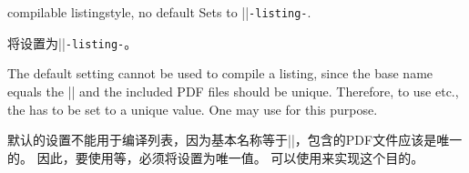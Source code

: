 \begin{docTcbKey}[][doc new and updated={2014-11-14}{2016-05-27}]{compilable listing}{}{style, no default}
Sets  to |\jobname|\texttt{-listing-}.

将设置为|\jobname|\texttt{-listing-}。 
\begin{marker}
The default  setting cannot be used to compile
a listing, since the base name equals the |\jobname| and the included PDF
files should be unique.
Therefore, to use  etc., the 
has to be set to a unique value.
One may use  for this purpose.

默认的设置不能用于编译列表，因为基本名称等于|\jobname|，包含的PDF文件应该是唯一的。 因此，要使用等，必须将设置为唯一值。 可以使用来实现这个目的。
\end{marker}
\end{docTcbKey}
